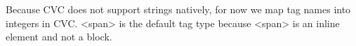 


Because CVC does not support strings natively, for now we map tag names into integers in CVC.  
<span> is the default tag type because <span> is an inline element and not a block.







